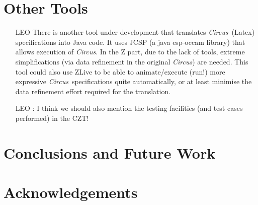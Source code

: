 \documentclass{llncs}
\newcommand{\Circus}{{\sf\slshape Circus}}
\begin{document}
\section{Other Tools}

    \begin{itemize}
        \item[LEO]
        There is another tool under development that translates \Circus\ (Latex) specifications into Java code.
        It uses JCSP (a java csp-occam library) that allows execution of \Circus.
        In the Z part, due to the lack of tools, extreme simplifications (via data refinement in the original \Circus)
        are needed.
        This tool could also use ZLive to be able to animate/execute (run!) more expressive \Circus\ specifications quite
        automatically, or at least minimise the data refinement effort required for the translation.
    \end{itemize}

    \begin{itemize}
        \item[LEO]: I think we should also mention the testing facilities (and test cases performed) in the CZT!
    \end{itemize}

\section{Conclusions and Future Work} \label{sec:conclusions}

\section*{Acknowledgements}



\end{document}
